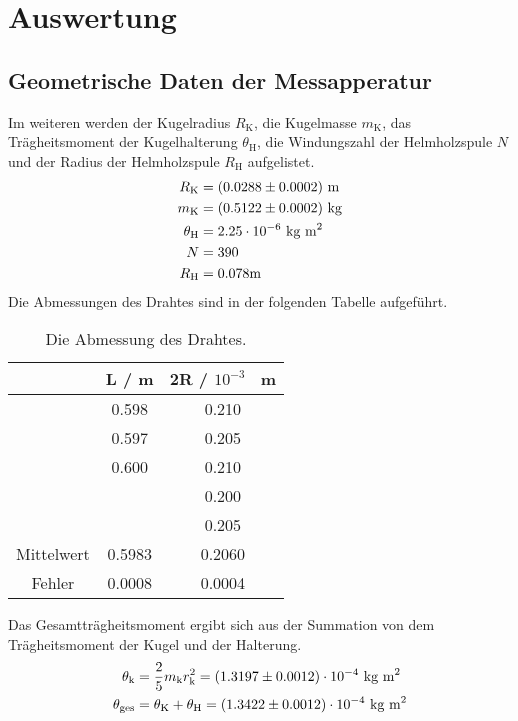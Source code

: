 \section{Auswertung}
\label{sec:Auswertung}

\subsection{Geometrische Daten der Messapperatur}
Im weiteren werden der Kugelradius $R_\text{K}$, die Kugelmasse $m_\text{K}$, das Trägheitsmoment der Kugelhalterung $\theta_\text{H}$, die Windungszahl der Helmholzspule $N$ und der Radius der Helmholzspule $R_\text{H}$ aufgelistet.
\begin{align*}
  R_\text{K} &= (\num{0.0288 +- 0.0002}) \ \text{m} \\
  m_\text{K} &= (\num{0.5122 +- 0.0002}) \ \text{kg} \\
  \theta_\text{H} &= 2.25 \cdot 10^{-6} \ \text{kg m}^2 \\
  N &= 390 \\
  R_\text{H} &= 0.078 \text{m}
\end{align*}
Die Abmessungen des Drahtes sind in der folgenden Tabelle aufgeführt.

\begin{table}[H] %
  \centering
  \begin{tabular}{c c c}
    \toprule
    & L / m & 2R / $10^{-3}$ \ m \\
    \midrule
    & 0.598 & 0.210 \\
    & 0.597 & 0.205 \\
    & 0.600 & 0.210 \\
    &       & 0.200 \\
    &       & 0.205 \\
    \bottomrule
    Mittelwert & 0.5983 & 0.2060 \\
    Fehler     & 0.0008 & 0.0004 \\
    \bottomrule
  \end{tabular}
  \caption{Die Abmessung des Drahtes.}
  \label{tab:Messwerte}
\end{table}

Das Gesamtträgheitsmoment ergibt sich aus der Summation von dem Trägheitsmoment der Kugel und der Halterung.
\begin{align*}
  \theta_\text{k} & = \frac{2}{5} m_\text{k} r^2_\text{k} = (\num{1.3197 +- 0.0012}) \cdot 10^{-4} \ \text{kg m}^2 \\
  \theta_\text{ges} & = \theta_\text{K} + \theta_\text{H} = (\num{1.3422 +- 0.0012}) \cdot 10^{-4} \ \text{kg m}^2
\end{align*}

